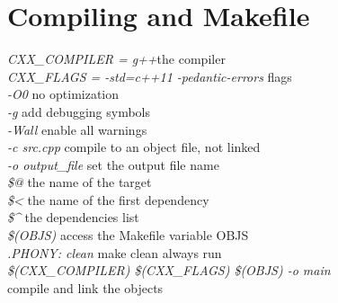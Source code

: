 \section{Compiling and Makefile}

\emph{CXX\_COMPILER = g++}\hfill the compiler\\
\emph{CXX\_FLAGS = -std=c++11 -pedantic-errors} \hfill flags\\
\emph{-O0} \hfill no optimization\\
\emph{-g} \hfill add debugging symbols\\
\emph{-Wall} \hfill enable all warnings\\
\emph{-c src.cpp} \hfill compile to an object file, not linked\\
\emph{-o output\_file} \hfill set the output file name\\
\emph{\$@} \hfill the name of the target\\
\emph{\$<} \hfill the name of the first dependency\\
\emph{\$\^{}} \hfill the dependencies list\\
\emph{\$(OBJS)} \hfill access the Makefile variable OBJS\\
\emph{.PHONY: clean} \hfill make clean always run\\
\emph{\$(CXX\_COMPILER) \$(CXX\_FLAGS) \$(OBJS) -o main} \\\hfill compile and link the objects\\